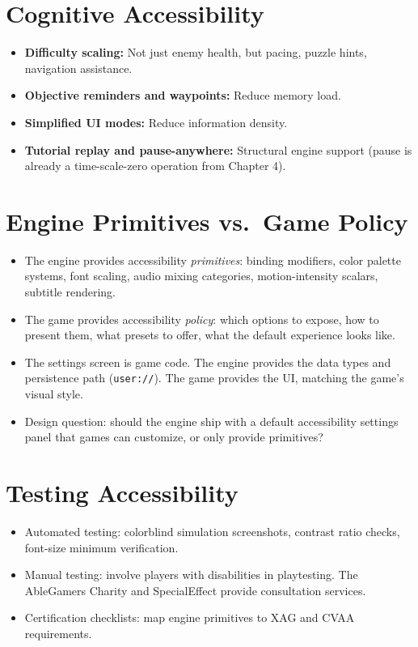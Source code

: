 \documentclass[
  11pt,
  letterpaper,
  DIV=11,
  numbers=noendperiod,
  twoside,
  open=right]{scrreprt}
\providecommand{\tightlist}{%
  \setlength{\itemsep}{0pt}\setlength{\parskip}{0pt}}
\begin{document}
\section{Cognitive Accessibility}\label{cognitive-accessibility}

\begin{itemize}
\tightlist
\item
  \textbf{Difficulty scaling:} Not just enemy health, but pacing, puzzle
  hints, navigation assistance.
\item
  \textbf{Objective reminders and waypoints:} Reduce memory load.
\item
  \textbf{Simplified UI modes:} Reduce information density.
\item
  \textbf{Tutorial replay and pause-anywhere:} Structural engine support
  (pause is already a time-scale-zero operation from Chapter 4).
\end{itemize}

\section{Engine Primitives vs.~Game
Policy}\label{engine-primitives-vs.-game-policy}

\begin{itemize}
\tightlist
\item
  The engine provides accessibility \emph{primitives}: binding
  modifiers, color palette systems, font scaling, audio mixing
  categories, motion-intensity scalars, subtitle rendering.
\item
  The game provides accessibility \emph{policy}: which options to
  expose, how to present them, what presets to offer, what the default
  experience looks like.
\item
  The settings screen is game code. The engine provides the data types
  and persistence path (\texttt{user://}). The game provides the UI,
  matching the game's visual style.
\item
  Design question: should the engine ship with a default accessibility
  settings panel that games can customize, or only provide primitives?
\end{itemize}

\section{Testing Accessibility}\label{testing-accessibility}

\begin{itemize}
\tightlist
\item
  Automated testing: colorblind simulation screenshots, contrast ratio
  checks, font-size minimum verification.
\item
  Manual testing: involve players with disabilities in playtesting. The
  AbleGamers Charity and SpecialEffect provide consultation services.
\item
  Certification checklists: map engine primitives to XAG and CVAA
  requirements.
\end{itemize}
\end{document}
